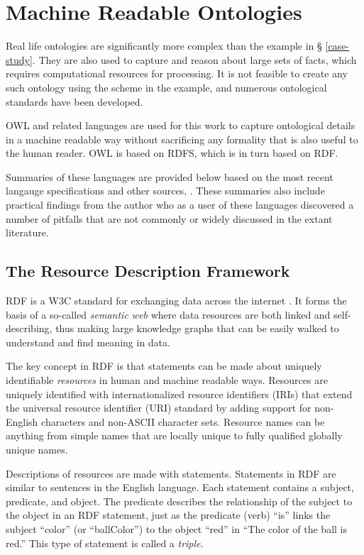 \section{Machine Readable Ontologies}

Real life ontologies are significantly more complex than the example in \S
\ref{case-study}. They are also used to capture and reason about large sets of
facts, which requires computational resources for processing. It is not feasible
to create any such ontology using the scheme in the example, and numerous
ontological standards have been developed. 

OWL and related languages are used for this work to
capture ontological details in a machine readable way without sacrificing any
formality that is also useful to the human reader. OWL is based on RDFS, which
is in turn based on RDF.

Summaries of these languages are provided below based on the most recent
langauge specifications and other sources, \cite{allemang_semantic_2008}. These
summaries also include practical findings from the author who as a user of
these languages discovered a number of pitfalls that are not commonly or widely
discussed in the extant literature.

\subsection{The Resource Description Framework}

RDF is a W3C standard for exchanging data
across the internet \cite{noauthor_rdf_nodate}\cite{noauthor_rdf_nodate-3}. It
forms the basis of a so-called \textit{semantic web} where data resources are both linked and
self-describing, thus making large knowledge graphs that can be easily walked
to understand and find meaning in data.

The key concept in RDF is that statements can be made about uniquely
identifiable \textit{resources} in human and machine readable ways. Resources
are uniquely identified with internationalized resource identifiers (IRIs) that
extend the universal resource identifier (URI) standard by adding support for
non-English characters and non-ASCII character sets. Resource names can be
anything from simple names that are locally unique to fully qualified globally
unique names.

Descriptions of resources are made with statements. Statements in RDF are
similar to sentences in the English language. Each statement contains a subject,
predicate, and object. The predicate describes the relationship of the subject
to the object in an RDF statement, just as the predicate (verb) ``is'' links the
subject ``color'' (or ``ballColor'') to the object ``red'' in ``The color of
the ball is red.'' This type of statement is called a \textit{triple}.

